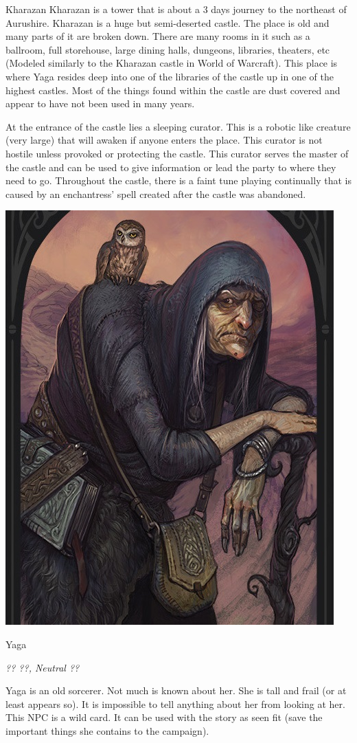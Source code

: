 \begin{commentbox}{Kharazan}
	Kharazan is a tower that is about a 3 days journey to the northeast of Aurushire. Kharazan is a huge but semi-deserted castle. The place is old and many parts of it are broken down. There are many rooms in it such as a ballroom, full storehouse, large dining halls, dungeons, libraries, theaters, etc (Modeled similarly to the Kharazan castle in World of Warcraft). This place is where Yaga resides deep into one of the libraries of the castle up in one of the highest castles. Most of the things found within the castle are dust covered and appear to have not been used in many years.
	
	At the entrance of the castle lies a sleeping curator. This is a robotic like creature (very large) that will awaken if anyone enters the place. This curator is not hostile unless provoked or protecting the castle. This curator serves the master of the castle and can be used to give information or lead the party to where they need to go. Throughout the castle, there is a faint tune playing continually that is caused by an enchantress' spell created after the castle was abandoned.
\end{commentbox}

\begin{center}
	\includegraphics[width=0.5\linewidth]{img/Yaga.jpg}
\end{center}

\begin{monsterbox}{Yaga}
	\begin{hangingpar}
		\textit{?? ??, Neutral ??}
	\end{hangingpar}
	\dndline%
	\basics[%
	armorclass = ??,
	hitpoints  = ??,
	speed      = ?? ft
	]
	\dndline%
	\stats[
	STR = \stat{}, %
	DEX = \stat{},
	CON = \stat{},
	INT = \stat{},
	WIS = \stat{},
	CHA = \stat{}
	]
	\dndline%
	\details[%
	languages = {Common},
	challenge = 20
	]
	\dndline%
	Yaga is an old sorcerer. Not much is known about her. She is tall and frail (or at least appears so). It is impossible to tell anything about her from looking at her. This NPC is a wild card. It can be used with the story as seen fit (save the important things she contains to the campaign).
\end{monsterbox}

